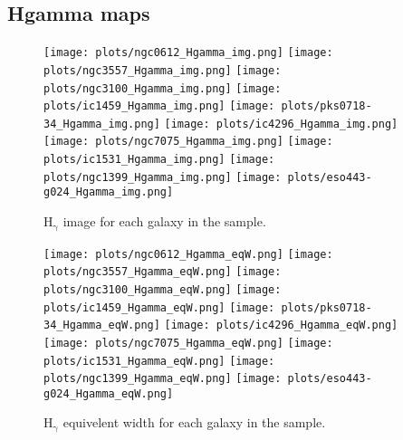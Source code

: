 \documentclass[fleqn,usenatbib,useAMS]{mnras}
\begin{document}
    \subsection{Hgamma maps}
        \label{subsec:Hgammamaps}
        \begin{figure*}
            \centering
            \texttt{[image: plots/ngc0612\_Hgamma\_img.png]}
            \texttt{[image: plots/ngc3557\_Hgamma\_img.png]}
            \texttt{[image: plots/ngc3100\_Hgamma\_img.png]}
            \texttt{[image: plots/ic1459\_Hgamma\_img.png]}
            \texttt{[image: plots/pks0718-34\_Hgamma\_img.png]}
            \texttt{[image: plots/ic4296\_Hgamma\_img.png]}
            \texttt{[image: plots/ngc7075\_Hgamma\_img.png]}
            \texttt{[image: plots/ic1531\_Hgamma\_img.png]}
            \texttt{[image: plots/ngc1399\_Hgamma\_img.png]}
            \texttt{[image: plots/eso443-g024\_Hgamma\_img.png]}
            \caption{H$_\mathrm{\gamma}$ image for each galaxy in the sample.}
            \label{fig:Hgamma_img}
        \end{figure*}


        \begin{figure*}
            \centering
            \texttt{[image: plots/ngc0612\_Hgamma\_eqW.png]}
            \texttt{[image: plots/ngc3557\_Hgamma\_eqW.png]}
            \texttt{[image: plots/ngc3100\_Hgamma\_eqW.png]}
            \texttt{[image: plots/ic1459\_Hgamma\_eqW.png]}
            \texttt{[image: plots/pks0718-34\_Hgamma\_eqW.png]}
            \texttt{[image: plots/ic4296\_Hgamma\_eqW.png]}
            \texttt{[image: plots/ngc7075\_Hgamma\_eqW.png]}
            \texttt{[image: plots/ic1531\_Hgamma\_eqW.png]}
            \texttt{[image: plots/ngc1399\_Hgamma\_eqW.png]}
            \texttt{[image: plots/eso443-g024\_Hgamma\_eqW.png]}
            \caption{H$_\mathrm{\gamma}$ equivelent width for each galaxy in the sample.}
            \label{fig:Hgamma_eqW}
        \end{figure*}
\end{document}
